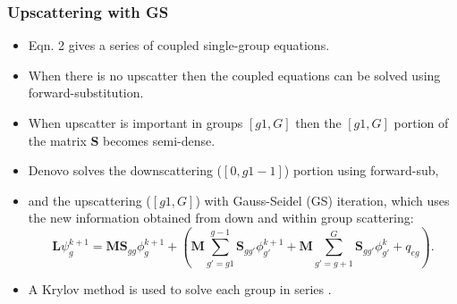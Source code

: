 \documentclass{beamer}
\begin{document}
\begin{frame}
  \frametitle{Upscattering with GS}
  
  \begin{itemize}
    \item Eqn. 2 gives a series of coupled single-group equations. \\
    \item When there is no upscatter then the coupled equations can be solved using forward-substitution. \\
    \item When upscatter is important in groups $[g1,G]$ then the $[g1,G]$ portion of the matrix $\mathbf{S}$ becomes semi-dense. 
    \item Denovo solves the downscattering ($[0,g1-1]$) portion using forward-sub,
    \item and the upscattering ($[g1, G]$) with Gauss-Seidel (GS) iteration, which uses the new information obtained from down and within group scattering: 
    \begin{equation}
       \mathbf{L}\psi^{k+1}_{g} = \mathbf{MS}_{gg}\phi^{k+1}_{g} + (\mathbf{M}\sum_{g'=g1}^{g-1}\mathbf{S}_{gg'}\phi^{k+1}_{g'} + \mathbf{M}\sum_{g'=g+1}^{G}\mathbf{S}_{gg'}\phi^{k}_{g'} + q_{eg}).
    \end{equation}
    \item A Krylov method is used to solve each group in series \cite{Den}.
\end{itemize}
 
\end{frame}
\end{document}
